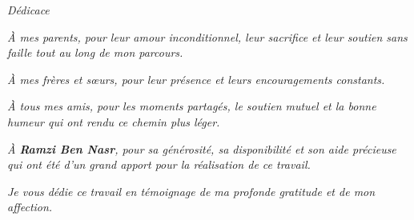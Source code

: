 \thispagestyle{empty}
\vspace*{\fill}

\begin{center}
\textit{\Large Dédicace}

\vspace{1.5cm}

\textit{À mes parents, pour leur amour inconditionnel, leur sacrifice et leur soutien sans faille tout au long de mon parcours.}

\vspace{0.8cm}

\textit{À mes frères et s\oe{}urs, pour leur présence et leurs encouragements constants.}

\vspace{0.8cm}

\textit{À tous mes amis, pour les moments partagés, le soutien mutuel et la bonne humeur qui ont rendu ce chemin plus léger.}

\vspace{0.8cm}

\textit{À \textbf{Ramzi Ben Nasr}, pour sa générosité, sa disponibilité et son aide précieuse qui ont été d'un grand apport pour la réalisation de ce travail.}

\vspace{1.5cm}

\textit{Je vous dédie ce travail en témoignage de ma profonde gratitude et de mon affection.}

\end{center}

\vspace*{\fill}
\clearpage
